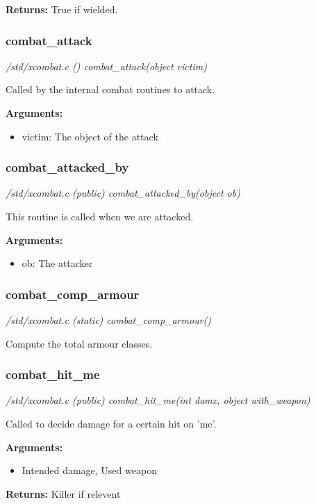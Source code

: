 {\bf Returns:}        True if wielded.


\subsubsection{combat\_attack}

{\em /std/xcombat.c () combat\_attack(object victim)}

Called by the internal combat routines to attack.

{\bf Arguments:}
\begin{itemize}
\item      victim: The object of the attack                
\end{itemize}


\subsubsection{combat\_attacked\_by}

{\em /std/xcombat.c (public) combat\_attacked\_by(object ob)}

This routine is called when we are attacked.

{\bf Arguments:}
\begin{itemize}
\item      ob: The attacker
\end{itemize}


\subsubsection{combat\_comp\_armour}

{\em /std/xcombat.c (static) combat\_comp\_armour()}

Compute the total armour classes.


\subsubsection{combat\_hit\_me}

{\em /std/xcombat.c (public) combat\_hit\_me(int damx, object with\_weapon)}

Called to decide damage for a certain hit on 'me'.

{\bf Arguments:}
\begin{itemize}
\item     Intended damage, Used weapon
\end{itemize}

{\bf Returns:}        Killer if relevent


